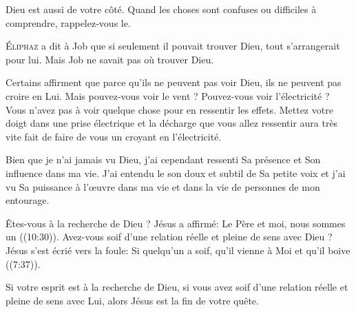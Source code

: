 Dieu est aussi de votre côté.
 Quand les choses sont confuses ou difficiles à comprendre, rappelez-vous le.

\dvrule






\lettrine{É}{liphaz} a dit à Job que si seulement il pouvait trouver Dieu,
 tout s'arrangerait pour lui. Mais Job ne savait pas où trouver Dieu.

Certains affirment que parce qu'ils ne peuvent pas voir Dieu,
 ils ne peuvent pas croire en Lui. Mais pouvez-vous voir le vent ?
 Pouvez-vous voir l'électricité ?
 Vous n'avez pas à voir quelque chose pour en ressentir les effets.
 Mettez votre doigt dans une prise électrique et la décharge
 que vous allez ressentir aura très vite fait de faire de vous
 un \Og croyant \Fg{} en l'électricité.

Bien que je n'ai jamais vu Dieu, j'ai cependant ressenti Sa présence
 et Son influence dans ma vie.
 J'ai entendu le son doux et subtil de Sa petite voix
 et j'ai vu Sa puissance à l'\oe{}uvre dans ma vie
 et dans la vie de personnes de mon entourage.

Êtes-vous à la recherche de Dieu ? Jésus a affirmé:
 \Og Le Père et moi, nous sommes un \Fg{} ((10:30)).
 Avez-vous soif d'une relation réelle et pleine de sens avec Dieu ?
 Jésus s'est écrié vers la foule:
 \Og Si quelqu'un a soif, qu'il vienne à Moi et qu'il boive \Fg{}
 ((7:37)).

Si votre esprit est à la recherche de Dieu, si vous avez soif
 d'une relation réelle et pleine de sens avec Lui,
 alors Jésus est la fin de votre quête.


\dvrule



